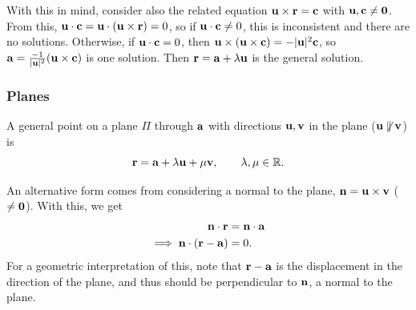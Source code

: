 \documentclass[a4paper]{scrartcl}
\begin{document}
With this in mind, consider also the related equation $\mathbf{u} \times \mathbf{r} = \mathbf{c}$ with $\mathbf{u}, \mathbf{c} \neq \mathbf{0}$. From this, $\mathbf{u} \cdot \mathbf{c} = \mathbf{u} \cdot (\mathbf{u} \times \mathbf{r}) = 0$, so if $\mathbf{u} \cdot \mathbf{c} \neq 0$, this is inconsistent and there are no solutions. Otherwise, if $\mathbf{u} \cdot \mathbf{c}= 0$, then $\mathbf{u} \times (\mathbf{u} \times \mathbf{c}) = -|\mathbf{u}|^2 \mathbf{c}$, so $\mathbf{a} = \frac{-1}{|\mathbf{u}|^2}(\mathbf{u} \times \mathbf{c})$ is one solution. Then $\mathbf{r} = \mathbf{a} + \lambda \mathbf{u}$ is the general solution.


\subsubsection{Planes}

A general point on a plane $\Pi$ through $\mathbf{a}$ with directions $\mathbf{u}, \mathbf{v}$ in the plane ($\mathbf{u} \not \parallel \mathbf{v}$) is
$$
\mathbf{r} = \mathbf{a} + \lambda \mathbf{u} + \mu \mathbf{v}, \quad \quad \lambda, \mu \in \mathbb{R}.
$$

\begin{center}
\end{center}

An alternative form comes from considering a normal to the plane, $\mathbf{n}= \mathbf{u} \times \mathbf{v}$ ($\neq \mathbf{0}$). With this, we get
\begin{align*}
    \mathbf{n} \cdot \mathbf{r} &= \mathbf{n} \cdot \mathbf{a}  \\
\implies   \mathbf{n} \cdot (\mathbf{r} - \mathbf{a}) &= 0.
\end{align*}
For a geometric interpretation of this, note that $\mathbf{r} - \mathbf{a}$ is the displacement in the direction of the plane, and thus should be perpendicular to $\mathbf{n}$, a normal to the plane.
\end{document}
